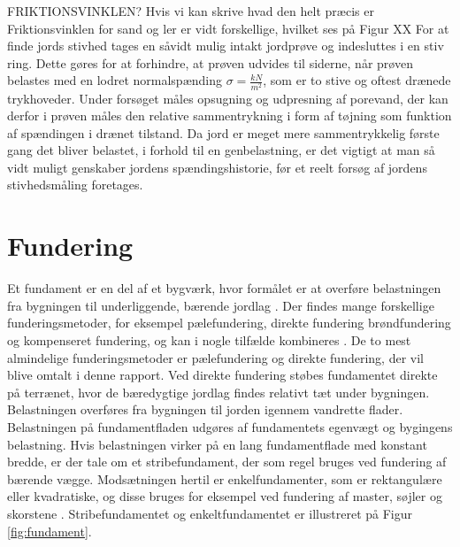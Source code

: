 \newline
\newline
FRIKTIONSVINKLEN? Hvis vi kan skrive hvad den helt præcis er
\newline
Friktionsvinklen for sand og ler er vidt forskellige, hvilket ses på Figur XX
\newline
\newline
For at finde jords stivhed tages en såvidt mulig intakt jordprøve og indesluttes i en stiv ring. Dette gøres for at forhindre, at prøven udvides til siderne, når prøven belastes med en lodret normalspænding $\sigma=\frac{kN}{m^2}$, som er to stive og oftest drænede trykhoveder. Under forsøget måles opsugning og udpresning af porevand, der kan derfor i prøven måles den relative sammentrykning i form af tøjning som funktion af spændingen i drænet tilstand. Da jord er meget mere sammentrykkelig første gang det bliver belastet, i forhold til en genbelastning, er det vigtigt at man så vidt muligt genskaber jordens spændingshistorie, før et reelt forsøg af jordens stivhedsmåling foretages. 

\section{Fundering}
Et fundament er en del af et bygværk, hvor formålet er at overføre belastningen fra bygningen til underliggende, bærende jordlag \citep[ s. 221]{geoteknik}. Der findes mange forskellige funderingsmetoder, for eksempel pælefundering, direkte fundering brøndfundering og kompenseret fundering, og kan i nogle tilfælde kombineres \citep{fundering}. De to mest almindelige funderingsmetoder er pælefundering og direkte fundering, der vil blive omtalt i denne rapport. 
\newline \indent{     }  Ved direkte fundering støbes fundamentet direkte på terrænet, hvor de bæredygtige jordlag findes relativt tæt under bygningen. Belastningen overføres fra bygningen til jorden igennem vandrette flader. Belastningen på fundamentfladen udgøres af fundamentets egenvægt og bygingens belastning. Hvis belastningen virker på en lang fundamentflade med konstant bredde, er der tale om et stribefundament, der som regel bruges ved fundering af bærende vægge. Modsætningen hertil er enkelfundamenter, som er rektangulære eller kvadratiske, og disse bruges for eksempel ved fundering af master, søjler og skorstene \citep[ s. 221]{geoteknik}. Stribefundamentet og enkeltfundamentet er illustreret på Figur \ref{fig:fundament}. 

